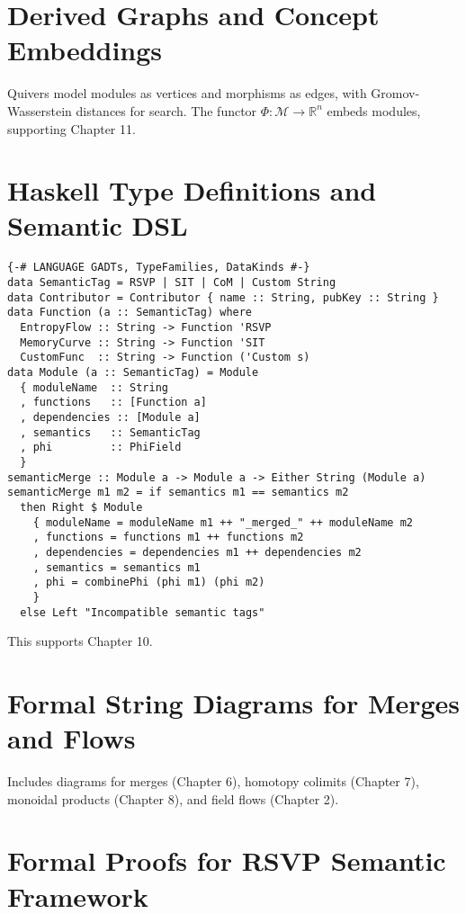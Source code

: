 \documentclass[12pt]{article}
\begin{document}
\section{Derived Graphs and Concept Embeddings}
\label{app:graphs}

Quivers model modules as vertices and morphisms as edges, with Gromov-Wasserstein distances for search. The functor $\Phi : \mathcal{M} \to \mathbb{R}^n$ embeds modules, supporting Chapter 11.

\section{Haskell Type Definitions and Semantic DSL}
\label{app:haskell}

\begin{lstlisting}
{-# LANGUAGE GADTs, TypeFamilies, DataKinds #-}
data SemanticTag = RSVP | SIT | CoM | Custom String
data Contributor = Contributor { name :: String, pubKey :: String }
data Function (a :: SemanticTag) where
  EntropyFlow :: String -> Function 'RSVP
  MemoryCurve :: String -> Function 'SIT
  CustomFunc  :: String -> Function ('Custom s)
data Module (a :: SemanticTag) = Module
  { moduleName  :: String
  , functions   :: [Function a]
  , dependencies :: [Module a]
  , semantics   :: SemanticTag
  , phi         :: PhiField
  }
semanticMerge :: Module a -> Module a -> Either String (Module a)
semanticMerge m1 m2 = if semantics m1 == semantics m2
  then Right $ Module
    { moduleName = moduleName m1 ++ "_merged_" ++ moduleName m2
    , functions = functions m1 ++ functions m2
    , dependencies = dependencies m1 ++ dependencies m2
    , semantics = semantics m1
    , phi = combinePhi (phi m1) (phi m2)
    }
  else Left "Incompatible semantic tags"
\end{lstlisting}

This supports Chapter 10.

\section{Formal String Diagrams for Merges and Flows}
\label{app:diagrams}

Includes diagrams for merges (Chapter 6), homotopy colimits (Chapter 7), monoidal products (Chapter 8), and field flows (Chapter 2).

\section{Formal Proofs for RSVP Semantic Framework}
\label{app:proofs}
\end{document}
